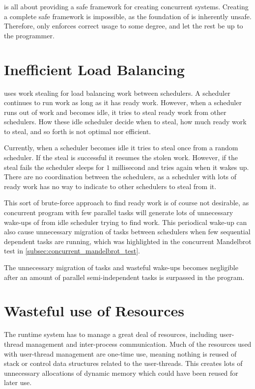 \Proxc{} is all about providing a safe framework for creating concurrent systems. Creating a complete safe framework is impossible, as the foundation of \Cpp{} is inherently unsafe. Therefore, \Proxc{} only enforces correct usage to some degree, and let the rest be up to the programmer.


\section{Inefficient Load Balancing}


\Proxc{} uses work stealing for load balancing work between schedulers. A scheduler continues to run work as long as it has ready work. However, when a scheduler runs out of work and becomes idle, it tries to steal ready work from other schedulers. How these idle scheduler decide when to steal, how much ready work to steal, and so forth is not optimal nor efficient.

Currently, when a scheduler becomes idle it tries to steal once from a random scheduler. If the steal is successful it resumes the stolen work. However, if the steal fails the scheduler sleeps for $1$ millisecond and tries again when it wakes up. There are no coordination between the schedulers, as a scheduler with lots of ready work has no way to indicate to other schedulers to steal from it. 

This sort of brute\hyp{}force approach to find ready work is of course not desirable, as concurrent program with few parallel tasks will generate lots of unnecessary wake\hyp{}ups of from idle scheduler trying to find work. This periodical wake\hyp{}up can also cause unnecessary migration of tasks between schedulers when few sequential dependent tasks are running, which was highlighted in the concurrent Mandelbrot test in \cref{subsec:concurrent_mandelbrot_test}.

The unnecessary migration of tasks and wasteful wake\hyp{}ups becomes negligible after an amount of parallel semi\hyp{}independent tasks is surpassed in the program.


\section{Wasteful use of Resources}


The \Proxc{} runtime system has to manage a great deal of resources, including user\hyp{}thread management and inter\hyp{}process communication. Much of the resources used with user\hyp{}thread management are one\hyp{}time use, meaning nothing is reused of stack or control data structures related to the user\hyp{}threads. This creates lots of unnecessary allocations of dynamic memory which could have been reused for later use.

